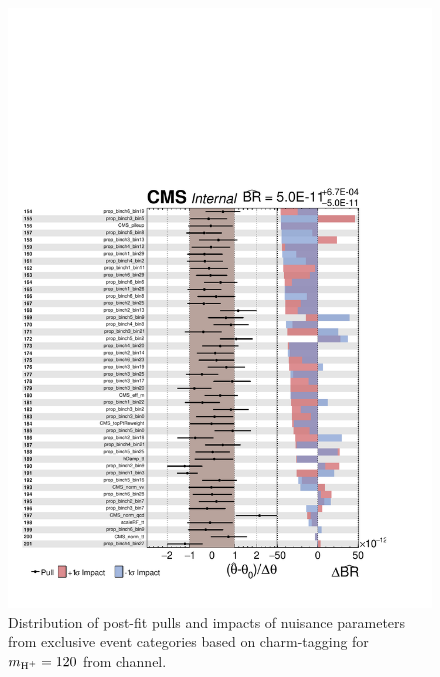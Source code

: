 \begin{figure}
\begin{center}
\includegraphics[width=1.0\textwidth]{Image/MLFit/ImpactNuis/nuisImpact4.pdf}
 \caption{Distribution of post-fit pulls and impacts of nuisance parameters from
     exclusive event categories based on charm-tagging for $m_{\text{H}^+}=120$
     \GeV from \ljets channel.}
\label{fig:nuisImpact4}
\end{center}
\end{figure}

